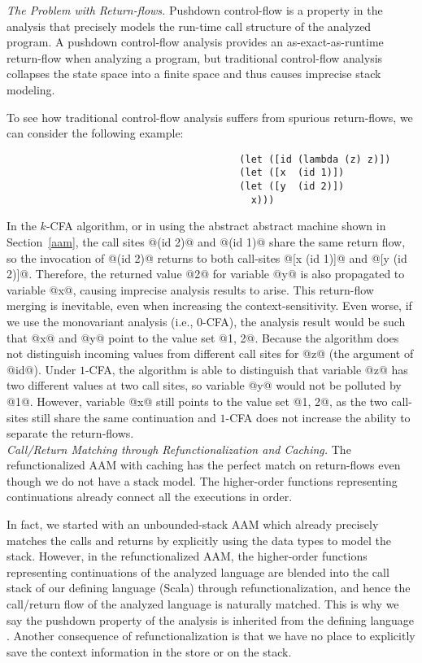 \documentclass[acmsmall, screen]{acmart}\settopmatter{}
\begin{document}
\textit{The Problem with Return-flows.}
Pushdown control-flow is a property in the analysis that precisely models the run-time
call structure of the analyzed program. A pushdown control-flow analysis provides an
as-exact-as-runtime return-flow when analyzing a program, but traditional
control-flow analysis collapses the state space into a finite space and
thus causes imprecise stack modeling.

To see how traditional control-flow analysis suffers from spurious return-flows,
we can consider the following example:

\begin{lstlisting}
                                        (let ([id (lambda (z) z)])
                                        (let ([x  (id 1)])
                                        (let ([y  (id 2)])
                                          x)))
\end{lstlisting}

In the $k$-CFA algorithm, or in using the abstract abstract machine shown in Section~\ref{aam},
the call sites @(id 2)@ and @(id 1)@ share the same return flow, so the invocation
of @(id 2)@ returns to both call-sites @[x (id 1)]@ and @[y (id 2)]@.  Therefore,
the returned value @2@ for variable @y@ is also propagated to variable @x@, causing
imprecise analysis results to arise. This return-flow merging is inevitable, even when
increasing the context-sensitivity. Even worse, if we use the monovariant analysis (i.e.,
$0$-CFA), the analysis result would be such that @x@ and @y@ point to the value set @{1, 2}@.
Because the algorithm does not distinguish incoming values from different call sites
for @z@ (the argument of @id@). Under $1$-CFA, the algorithm is able to distinguish that variable
@z@ has two different values at two call sites, so variable @y@ would not be polluted by
@1@. However, variable @x@ still points to the value set @{1, 2}@, as the two call-sites
still share the same continuation and $1$-CFA does not increase the ability to separate the
return-flows. \\

\textit{Call/Return Matching through Refunctionalization and Caching.}
The refunctionalized AAM with caching has the perfect match on return-flows even though
we do not have a stack model. The higher-order functions representing continuations
already connect all the executions in order.

In fact, we started with an unbounded-stack AAM which already precisely matches the calls and returns
by explicitly using the data types to model the stack.
However, in the refunctionalized AAM, the higher-order functions representing continuations of the analyzed 
language are blended into the call stack of our defining language (Scala) through 
refunctionalization, and hence the call/return flow of the analyzed language is naturally matched.
This is why we say the pushdown property of the analysis is inherited from the defining language \cite{darais2017abstracting}.
Another consequence of refunctionalization is that we have no place to explicitly save the context
information in the store or on the stack.
\end{document}

